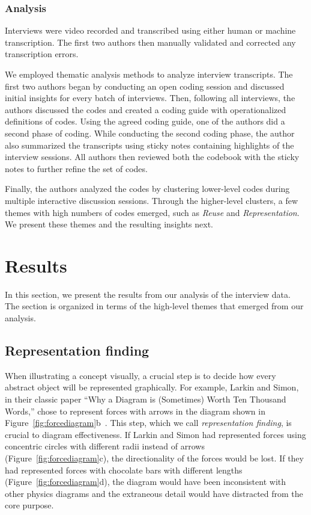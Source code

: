 \subsubsection{Analysis}
Interviews were video recorded and transcribed using either human or machine transcription. The first two authors then manually validated and corrected any transcription errors.

We employed thematic analysis methods \cite{thematicAnalysisInPsych} to analyze interview transcripts. The first two authors began by conducting an open coding session and discussed initial insights for every batch of interviews. Then, following all interviews, the authors discussed the codes and created a coding guide with operationalized definitions of codes. Using the agreed coding guide, one of the authors did a second phase of coding. While conducting the second coding phase, the author also summarized the transcripts using sticky notes containing highlights of the interview sessions. All authors then reviewed both the codebook with the sticky notes to further refine the set of codes.

Finally, the authors analyzed the codes by clustering lower-level codes during multiple interactive discussion sessions. Through the higher-level clusters, a few themes with high numbers of codes emerged, such as \emph{Reuse} and \emph{Representation}. We present these themes and the resulting insights next.

\section{Results}



In this section, we present the results from our analysis of the interview data. The section is organized in terms of the high-level themes that emerged from our analysis.

\subsection{Representation finding}

When illustrating a concept visually, a crucial step is to decide how every abstract object will be represented graphically. For example, Larkin and Simon, in their classic paper ``Why a Diagram is (Sometimes) Worth Ten Thousand Words,'' chose to represent forces with arrows in the diagram shown in Figure~\ref{fig:forcediagram}b~\cite{whyDiagramWorth}. This step, which we call \textit{representation finding}, is crucial to diagram effectiveness. If Larkin and Simon had represented forces using concentric circles with different radii instead of arrows (Figure~\ref{fig:forcediagram}c), the directionality of the forces would be lost. If they had represented forces with chocolate bars with different lengths (Figure~\ref{fig:forcediagram}d), the diagram would have been inconsistent with other physics diagrams and the extraneous detail would have distracted from the core purpose. 

